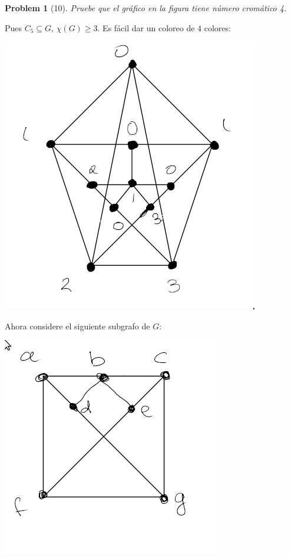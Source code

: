 \documentclass[a4paper, 12pt]{article}
\newtheorem{problem}{Problem}
\newtheorem{problem}{Problem}
\begin{document}
\pagebreak 

\begin{problem}[10]
    Pruebe que el gráfico en la figura tiene número cromático 4.
\end{problem}

Pues $C_5 \subseteq G$, $\chi(G) \geq 3$. Es fácil dar un coloreo de $4$
colores:


\begin{center}
\includegraphics[scale=0.3]{Grafo10}
\end{center}

Ahora considere el siguiente subgrafo de $G$:

\begin{center}
\includegraphics[scale=0.3]{Subgrafo10}
\end{center}
\end{document}
